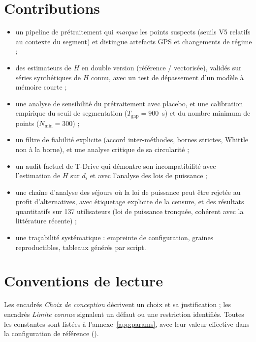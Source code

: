 \documentclass[12pt,a4paper]{report}
\theoremstyle{definition}
\DeclareRobustCommand{\code}[1]{\texorpdfstring{\texttt{\detokenize{#1}}}{\detokenize{#1}}}
\begin{document}
\section{Contributions}

\begin{itemize}
  \item un pipeline de prétraitement qui \emph{marque} les points suspects (seuils V5
  relatifs au contexte du segment) et distingue artefacts GPS et changements de régime ;
  \item des estimateurs de $H$ en double version (référence / vectorisée), validés sur
  séries synthétiques de $H$ connu, avec un test de dépassement d'un modèle à mémoire
  courte ;
  \item une analyse de sensibilité du prétraitement avec placebo, et une calibration
  empirique du seuil de segmentation ($T_{\mathrm{gap}}=900$~s) et du nombre minimum de
  points ($N_{\min}=300$) ;
  \item un filtre de fiabilité explicite (accord inter-méthodes, bornes strictes, Whittle
  non à la borne), et une analyse critique de sa circularité ;
  \item un audit factuel de T-Drive qui démontre son incompatibilité avec l'estimation
  de $H$ sur $d_i$ et avec l'analyse des lois de puissance ;
  \item une chaîne d'analyse des séjours où la loi de puissance peut être rejetée au
  profit d'alternatives, avec étiquetage explicite de la censure, et des résultats
  quantitatifs sur 137 utilisateurs (loi de puissance tronquée, cohérent avec la
  littérature récente) ;
  \item une traçabilité systématique : empreinte de configuration, graines reproductibles,
  tableaux générés par script.
\end{itemize}

\section{Conventions de lecture}

Les encadrés \emph{Choix de conception} décrivent un choix et sa justification ; les
encadrés \emph{Limite connue} signalent un défaut ou une restriction identifiés. Toutes
les constantes sont listées à l'annexe~\ref{app:params}, avec leur valeur effective dans
la configuration de référence (\code{TIME_GAP_THRESHOLD = 900}).
\end{document}
